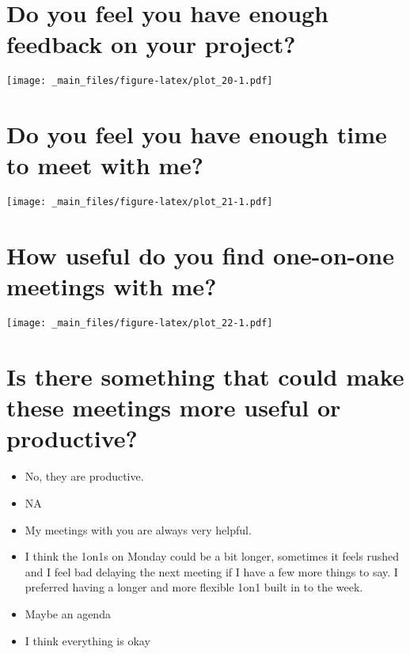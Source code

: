 \documentclass[
]{book}
\providecommand{\tightlist}{%
  \setlength{\itemsep}{0pt}\setlength{\parskip}{0pt}}
\begin{document}
\hypertarget{do-you-feel-you-have-enough-feedback-on-your-project}{%
\section{Do you feel you have enough feedback on your project?}\label{do-you-feel-you-have-enough-feedback-on-your-project}}

\texttt{[image: \_main\_files/figure-latex/plot\_20-1.pdf]}

\hypertarget{do-you-feel-you-have-enough-time-to-meet-with-me}{%
\section{Do you feel you have enough time to meet with me?}\label{do-you-feel-you-have-enough-time-to-meet-with-me}}

\texttt{[image: \_main\_files/figure-latex/plot\_21-1.pdf]}

\hypertarget{how-useful-do-you-find-one-on-one-meetings-with-me}{%
\section{How useful do you find one-on-one meetings with me?}\label{how-useful-do-you-find-one-on-one-meetings-with-me}}

\texttt{[image: \_main\_files/figure-latex/plot\_22-1.pdf]}

\hypertarget{is-there-something-that-could-make-these-meetings-more-useful-or-productive}{%
\section{Is there something that could make these meetings more useful or productive?}\label{is-there-something-that-could-make-these-meetings-more-useful-or-productive}}

\begin{itemize}
\tightlist
\item
  No, they are productive.
\item
  NA
\item
  My meetings with you are always very helpful.
\item
  I think the 1on1s on Monday could be a bit longer, sometimes it feels rushed and I feel bad delaying the next meeting if I have a few more things to say. I preferred having a longer and more flexible 1on1 built in to the week.
\item
  Maybe an agenda
\item
  I think everything is okay
\end{itemize}
\end{document}
